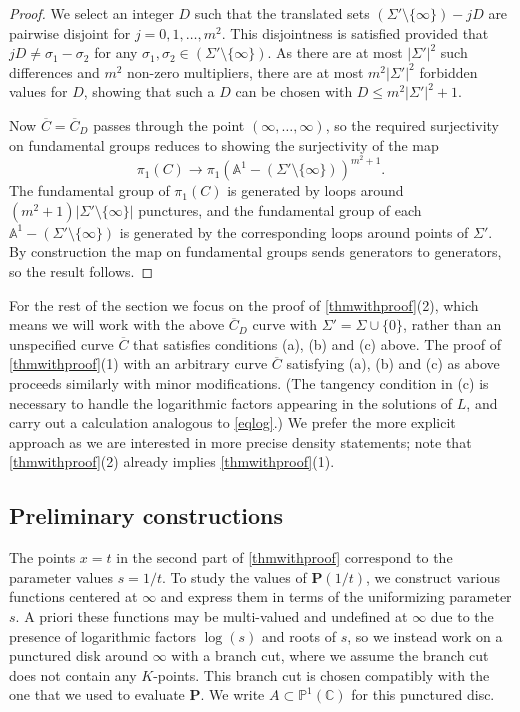 \documentclass[10pt]{article}
\numberwithin{equation}{section}
\theoremstyle{plain}
\theoremstyle{definition}
\theoremstyle{remark}
\newcommand{\PP}{\mathbb{P}}
\begin{document}
\begin{proof}
We select an integer $D$ such that the translated sets $(\Sigma' \setminus \{ \infty \}) - jD$ are pairwise disjoint for $j = 0, 1, \dots, m^2$. This disjointness is satisfied provided that $jD \neq \sigma_1 - \sigma_2$ for any $\sigma_1, \sigma_2 \in (\Sigma' \setminus \{ \infty \})$. As there are at most $|\Sigma'|^2$ such differences and $m^2$ non-zero multipliers, there are at most $m^2|\Sigma'|^2$ forbidden values for $D$, showing that such a $D$ can be chosen with $D \le m^2|\Sigma'|^2 + 1$. 

Now $\overline{C} = \overline{C}_{D}$ passes through the point $(\infty, \hdots, \infty)$, so the required surjectivity on fundamental groups reduces to showing the surjectivity of the map 
\[ \pi_1(C) \to \pi_1(\mathbb{A}^1 - (\Sigma' \setminus \{ \infty \}))^{m^2 + 1} . \]
The fundamental group of $\pi_1(C)$ is generated by loops around $(m^2 + 1) |\Sigma' \setminus \{ \infty \}|$ punctures, and the fundamental group of each $\mathbb{A}^1 - (\Sigma' \setminus \{ \infty \})$ is generated by the corresponding loops around points of $\Sigma'$. By construction the map on fundamental groups sends generators to generators, so the result follows.
\end{proof}

For the rest of the section we focus on the proof of \autoref{thmwithproof}(2), which means we will work with the above $\overline{C}_D$ curve with $\Sigma' = \Sigma \cup \{ 0 \}$, rather than an unspecified curve $\overline{C}$ that satisfies conditions (a), (b) and (c) above. The proof of \autoref{thmwithproof}(1) with an arbitrary curve $\overline{C}$ satisfying (a), (b) and (c) as above proceeds similarly with minor modifications. (The tangency condition in (c) is necessary to handle the logarithmic factors appearing in the solutions of $L$, and carry out a calculation analogous to \eqref{eqlog}.) We prefer the more explicit approach as we are interested in more precise density statements; note that \autoref{thmwithproof}(2) already implies \autoref{thmwithproof}(1). %

\subsection{Preliminary constructions}

The points $x = t$ in the second part of \autoref{thmwithproof} correspond to the parameter values $s = 1/t$. To study the values of $\mathbf{P}(1/t)$, we construct various functions centered at $\infty$ and express them in terms of the uniformizing parameter $s$. A priori these functions may be multi-valued and undefined at $\infty$ due to the presence of logarithmic factors $\log(s)$ and roots of $s$, so we instead work on a punctured disk around $\infty$ with a branch cut, where we assume the branch cut does not contain any $K$-points. This branch cut is chosen compatibly with the one that we used to evaluate $\mathbf{P}$. We write $A \subset \PP^1(\mathbb{C})$ for this punctured disc. 
\end{document}
